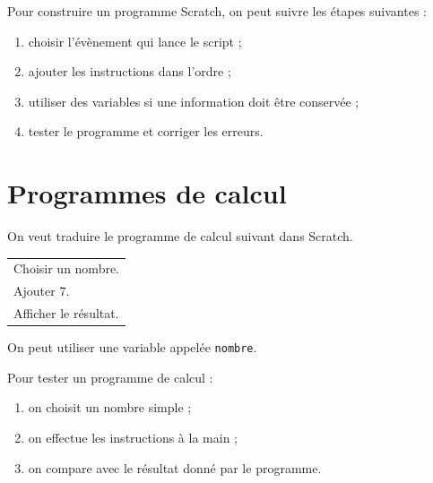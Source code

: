 \documentclass[a4paper,10pt]{report}
\begin{document}
\begin{meth}
Pour construire un programme Scratch, on peut suivre les étapes suivantes :
\begin{enumerate}
\item choisir l'évènement qui lance le script ;
\item ajouter les instructions dans l'ordre ;
\item utiliser des variables si une information doit être conservée ;
\item tester le programme et corriger les erreurs.
\end{enumerate}
\end{meth}

\section{Programmes de calcul}

\begin{exemple}
On veut traduire le programme de calcul suivant dans Scratch.
\begin{center}
\begin{tabular}{|p{8cm}|}
\hline
Choisir un nombre.\\
Ajouter $7$.\\
Afficher le résultat.\\
\hline
\end{tabular}
\end{center}

On peut utiliser une variable appelée \texttt{nombre}.

\begin{center}
\begin{scratch}
\end{scratch}
\end{center}
\end{exemple}

\begin{meth}
Pour tester un programme de calcul :
\begin{enumerate}
\item on choisit un nombre simple ;
\item on effectue les instructions à la main ;
\item on compare avec le résultat donné par le programme.
\end{enumerate}
\end{meth}
\end{document}
